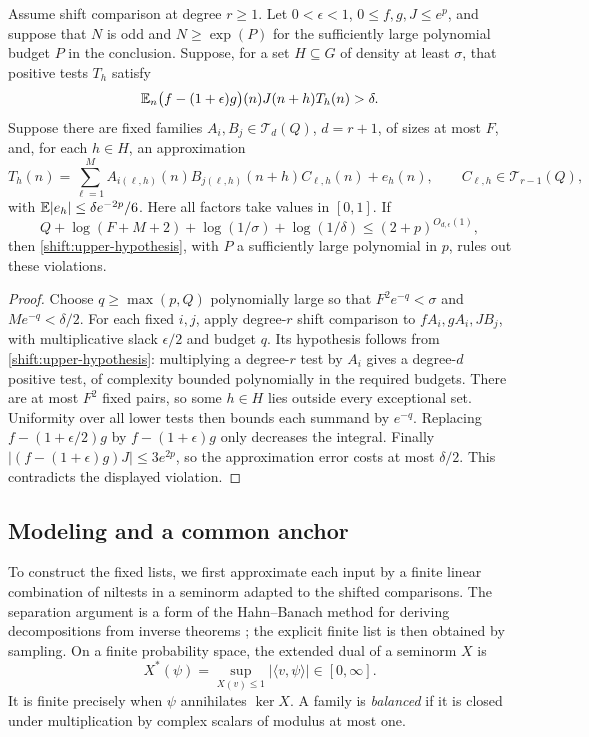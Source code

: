 \begin{lemma}\label{shift:fixed-lists-suffice}
Assume shift comparison at degree $r\geq1$.
Let $0<\epsilon<1$, $0\leq f,g,J\leq e^p$, and suppose that
$N$ is odd and $N\geq\exp(P)$ for the sufficiently large
polynomial budget $P$ in the conclusion.  Suppose, for a set
$H\subseteq G$ of density at least $\sigma$, that positive tests
$T_h$ satisfy
\[
 \mathbb E_n\bigl(f-(1+\epsilon)g\bigr)(n)J(n+h)T_h(n)>\delta.
\]
Suppose there are fixed families $A_i,B_j\in\mathcal T_d(Q)$,
$d=r+1$, of sizes at most $F$, and, for each $h\in H$,
an approximation
\[
 T_h(n)=\sum_{\ell=1}^{M}A_{i(\ell,h)}(n)
 B_{j(\ell,h)}(n+h)C_{\ell,h}(n)+e_h(n),
 \qquad C_{\ell,h}\in\mathcal T_{r-1}(Q),
\]
with $\mathbb E|e_h|\leq\delta e^{-2p}/6$.
Here all factors take values in $[0,1]$.
If
\[
 Q+\log(F+M+2)+\log(1/\sigma)+\log(1/\delta)
 \leq(2+p)^{O_{d,\epsilon}(1)},
\]
then \eqref{shift:upper-hypothesis}, with $P$ a sufficiently
large polynomial in $p$, rules out these violations.
\end{lemma}
\begin{proof}
Choose $q\geq\max(p,Q)$ polynomially large so that
$F^2e^{-q}<\sigma$ and $Me^{-q}<\delta/2$.
For each fixed $i,j$, apply degree-$r$ shift comparison to
$fA_i,gA_i,JB_j$, with multiplicative slack $\epsilon/2$ and
budget $q$.  Its hypothesis follows from
\eqref{shift:upper-hypothesis}: multiplying a degree-$r$ test
by $A_i$ gives a degree-$d$ positive test, of complexity bounded
polynomially in the required budgets.
There are at most $F^2$ fixed pairs, so some $h\in H$ lies
outside every exceptional set.  Uniformity over all lower tests
then bounds each summand by $e^{-q}$.  Replacing
$f-(1+\epsilon/2)g$ by $f-(1+\epsilon)g$ only decreases the
integral.  Finally
$|(f-(1+\epsilon)g)J|\leq3e^{2p}$, so the approximation error
costs at most $\delta/2$.  This contradicts the displayed
violation.
\end{proof}

\subsection{Modeling and a common anchor}

To construct the fixed lists, we first approximate each input by a
finite linear combination of niltests in a seminorm adapted to the
shifted comparisons. The separation argument is a form of the
Hahn--Banach method for deriving decompositions from inverse theorems
\cite[Section~3.2]{GowersHahnBanach2010}; the explicit finite list is
then obtained by sampling.  On a finite probability space, the extended dual of a
seminorm $X$ is
\[
 X^*(\psi)=\sup_{X(v)\le1}|\langle v,\psi\rangle|\in[0,\infty].
\]
It is finite precisely when $\psi$ annihilates $\ker X$.
A family is \emph{balanced} if it is closed under multiplication by
complex scalars of modulus at most one.

